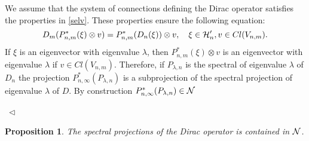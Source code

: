 \documentclass[12pt]{article}
\newcommand{\eproof}{{~\hfill$ \triangleleft$}}
\def\ca{{\cal A}}
\def\ch{{\cal H}}
\def\cn{{\cal N}}
\newtheorem{cor}[thm]{Corollary}
\newtheorem{prop}[thm]{Proposition}
\newtheorem{lemma}[thm]{Lemma}
\newcommand{\bbZ}{{\Bbb Z}}
\begin{document}
{%





We assume that the system of connections defining the Dirac operator satisfies the properties in \ref{selv}.
These properties ensure the following equation:
$$D_m(P^*_{n,m}(\xi)\otimes v)= P^*_{n,m}(D_n(\xi))\otimes v, \quad \xi\in \ch'_n, v\in Cl(V_{n,m}).$$
If $\xi$ is an eigenvector with eigenvalue $\lambda$, then $P^*_{n,m}(\xi )\otimes v$ is an eigenvector with eigenvalue $\lambda$ if $v\in Cl(V_{n,m})$. Therefore, if $P_{\lambda, n}$ is the spectral of eigenvalue $\lambda$ of $D_n$ the projection $P_{n,\infty}^*(P_{\lambda ,n})$ is a subprojection of the spectral projection of eigenvalue $\lambda$ of $D$. By construction $P_{n,\infty}^* (P_{\lambda ,n}) \in \cn$


\eproof
\begin{prop}
The spectral projections of the Dirac operator is contained in $\cn$.
\end{prop}

}
\end{document}

